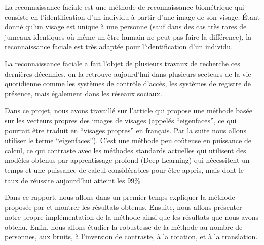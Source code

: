 La reconnaissance faciale est une méthode de reconnaissance biométrique
qui consiste en l'identification d'un individu à partir d'une image de son
visage. Étant donné qu'un visage est unique à une personne (sauf dans des cas très
rares de jumeaux identiques où même un être humain ne peut pas faire 
la différence), la reconnaissance faciale est très adaptée pour l'identification
d'un individu.

La reconnaissance faciale a fait l'objet de plusieurs travaux de recherche ces dernières décennies,
on la retrouve aujourd'hui dans plusieurs secteurs de la vie quotidienne comme les systèmes de
contrôle d'accès, les systèmes de registre de présence, mais également dans les réseaux sociaux.

Dans ce projet, nous avons travaillé sur l'article \cite{} qui propose une méthode
basée sur les vecteurs propres des images de visages (appelés ``eigenfaces'', ce qui pourrait être 
traduit en ``visages propres'' en français. Par la suite nous allons utiliser le terme ``eigenfaces'').
C'est une méthode peu coûteuse en puissance de calcul, ce qui contraste avec les méthodes standards
actuelles qui utilisent des modèles obtenus par apprentissage profond (Deep Learning) qui nécessitent un
temps et une puissance de calcul considérables pour être appris, mais dont le taux de réussite aujourd'hui
atteint les 99\%.

Dans ce rapport, nous allons dans un premier temps expliquer la méthode proposée par \cite{} et
montrer les résultats obtenus. Ensuite, nous allons présenter notre propre implémentation de la méthode
ainsi que les résultats que nous avons obtenu. Enfin, nous allons étudier la robustesse de la méthode
au nombre de personnes, aux bruits, à l'inversion de contraste, à la rotation, et à la translation.